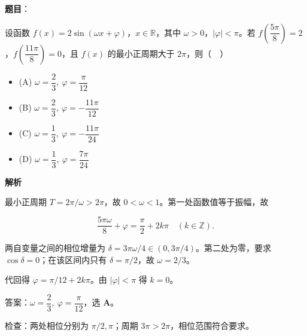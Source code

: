 \begin{answer}

\textbf{题目}：

设函数 $f(x)=2\sin(\omega x+\varphi)$，$x\in\mathbb R$，其中 $\omega>0$，$|\varphi|<\pi$。若 $f\left(\dfrac{5\pi}{8}\right)=2$，$f\left(\dfrac{11\pi}{8}\right)=0$，且 $f(x)$ 的最小正周期大于 $2\pi$，则（　）

\begin{itemize}
\item (A) $\omega=\dfrac23,\ \varphi=\dfrac{\pi}{12}$
\item (B) $\omega=\dfrac23,\ \varphi=-\dfrac{11\pi}{12}$
\item (C) $\omega=\dfrac13,\ \varphi=-\dfrac{11\pi}{24}$
\item (D) $\omega=\dfrac13,\ \varphi=\dfrac{7\pi}{24}$
\end{itemize}

\textbf{解析}

最小正周期 $T=2\pi/\omega>2\pi$，故 $0<\omega<1$。第一处函数值等于振幅，故

\nopagebreak[4]
\[\frac{5\pi\omega}{8}+\varphi=\frac\pi2+2k\pi\quad(k\in\mathbb Z).\]

两自变量之间的相位增量为 $\delta=3\pi\omega/4\in(0,3\pi/4)$。第二处为零，要求 $\cos\delta=0$；在该区间内只有 $\delta=\pi/2$，故 $\omega=2/3$。

代回得 $\varphi=\pi/12+2k\pi$。由 $|\varphi|<\pi$ 得 $k=0$。

答案：$\boxed{\omega=\dfrac23,\ \varphi=\dfrac\pi{12}}$，选 \textbf{A}。

检查：两处相位分别为 $\pi/2,\pi$；周期 $3\pi>2\pi$，相位范围符合要求。


\end{answer}
